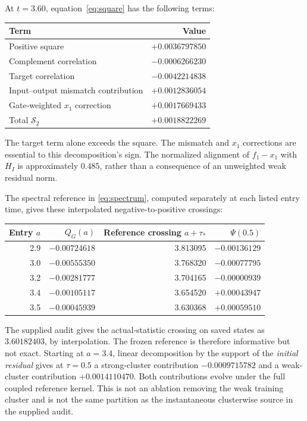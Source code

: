 \documentclass[10pt]{article}
\begin{document}
At $t=3.60$, equation~\eqref{eq:square} has the following terms:
\begin{center}
\begin{tabular}{lr}\toprule
Term & Value\\\midrule
Positive square & $+0.0036797850$\\
Complement correlation & $-0.0006266230$\\
Target correlation & $-0.0042214838$\\
Input--output mismatch contribution & $+0.0012836054$\\
Gate-weighted $x_1$ correction & $+0.0017669433$\\\midrule
Total $\mathcal S_2$ & $+0.0018822269$\\\bottomrule
\end{tabular}
\end{center}
The target term alone exceeds the square. The mismatch and $x_1$ corrections
are essential to this decomposition's sign. The normalized alignment of
$f_1-x_1$ with $H_I$ is approximately $0.485$, rather than a consequence
of an unweighted weak residual norm.

The spectral reference in \eqref{eq:spectrum}, computed separately at each
listed entry time, gives these interpolated negative-to-positive crossings:
\begin{center}
\begin{tabular}{rrrr}\toprule
Entry $a$ & $Q_G(a)$ & Reference crossing $a+\tau_*$ & $\Psi(0.5)$\\\midrule
2.9 & $-0.00724618$ & 3.813095 & $-0.00136129$\\
3.0 & $-0.00555350$ & 3.768320 & $-0.00077795$\\
3.2 & $-0.00281777$ & 3.704165 & $-0.00000939$\\
3.4 & $-0.00105117$ & 3.654520 & $+0.00043947$\\
3.5 & $-0.00045939$ & 3.630368 & $+0.00059510$\\\bottomrule
\end{tabular}
\end{center}
The supplied audit gives the actual-statistic crossing on saved states as
$3.60182403$, by interpolation. The frozen reference is therefore informative
but not exact. Starting at $a=3.4$, linear decomposition by the support of the
\emph{initial residual} gives at $\tau=0.5$ a strong-cluster contribution
$-0.0009715782$ and a weak-cluster contribution $+0.0014110470$.
Both contributions evolve under the full coupled reference kernel. This is
not an ablation removing the weak training cluster and is not the same
partition as the instantaneous clusterwise source in the supplied audit.
\end{document}
